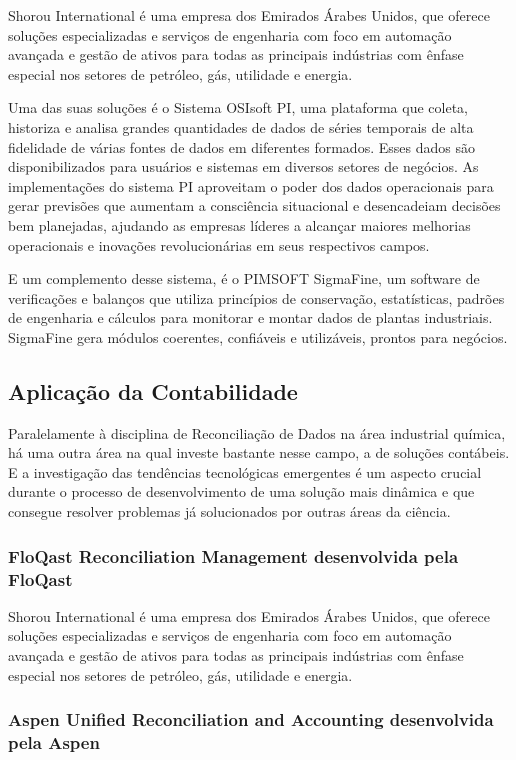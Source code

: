 Shorou International é uma empresa dos Emirados Árabes Unidos, que oferece soluções especializadas e serviços de engenharia com foco em automação avançada e gestão de ativos para todas as principais indústrias com ênfase especial nos setores de petróleo, gás, utilidade e energia.

Uma das suas soluções é o Sistema OSIsoft PI, uma plataforma que coleta, historiza e analisa grandes quantidades de dados de séries temporais de alta fidelidade de várias fontes de dados em diferentes formados. Esses dados são disponibilizados para usuários e sistemas em diversos setores de negócios. As implementações do sistema PI aproveitam o poder dos dados operacionais para gerar previsões que aumentam a consciência situacional e desencadeiam decisões bem planejadas, ajudando as empresas líderes a alcançar maiores melhorias operacionais e inovações revolucionárias em seus respectivos campos. 

E um complemento desse sistema, é o PIMSOFT SigmaFine, um software de verificações e balanços que utiliza princípios de conservação, estatísticas, padrões de engenharia e cálculos para monitorar e montar dados de plantas industriais. SigmaFine gera módulos coerentes, confiáveis e utilizáveis, prontos para negócios.

\subsection{Aplicação da Contabilidade}

Paralelamente à disciplina de Reconciliação de Dados na área industrial química, há uma outra área na qual investe bastante nesse campo, a de soluções contábeis. E a investigação das tendências tecnológicas emergentes é um aspecto crucial durante o processo de desenvolvimento de uma solução mais dinâmica e que consegue resolver problemas já solucionados por outras áreas da ciência.

\subsubsection{FloQast Reconciliation Management desenvolvida pela FloQast}

Shorou International é uma empresa dos Emirados Árabes Unidos, que oferece soluções especializadas e serviços de engenharia com foco em automação avançada e gestão de ativos para todas as principais indústrias com ênfase especial nos setores de petróleo, gás, utilidade e energia.

\subsubsection{Aspen Unified Reconciliation and Accounting desenvolvida pela Aspen}

